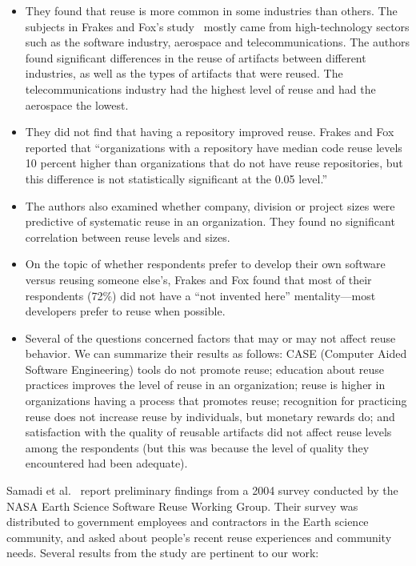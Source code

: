 \documentclass{casicswhitepaper}
\begin{document}
\begin{itemize}

\item They found that reuse is more common in some industries than others.  The subjects in Frakes and Fox's study~\cite{frakes1995sixteen} mostly came from high-technology sectors such as the software industry, aerospace and telecommunications.  The authors found significant differences in the reuse of artifacts between different industries, as well as the types of artifacts that were reused.  The telecommunications industry had the highest level of reuse and had the aerospace the lowest.

\item They did not find that having a repository improved reuse.  Frakes and Fox reported that ``organizations with a repository have median code reuse levels 10 percent higher than organizations that do not have reuse repositories, but this difference is not statistically significant at the 0.05 level.''

\item The authors also examined whether company, division or project sizes were predictive of systematic reuse in an organization.  They found no significant correlation between reuse levels and sizes.

\item On the topic of whether respondents prefer to develop their own software versus reusing someone else's, Frakes and Fox found that most of their respondents (72\%) did not have a ``not invented here'' mentality---most developers prefer to reuse when possible.

\item Several of the questions concerned factors that may or may not affect reuse behavior.  We can summarize their results as follows: CASE (Computer Aided Software Engineering) tools do not promote reuse; education about reuse practices improves the level of reuse in an organization; reuse is higher in organizations having a process that promotes reuse;  recognition for practicing reuse does not increase reuse by individuals, but monetary rewards do; and satisfaction with the quality of reusable artifacts did not affect reuse levels among the respondents (but this was because the level of quality they encountered had been adequate).

\end{itemize}

Samadi et al.~\cite{samadi_2004} report preliminary findings from a 2004 survey conducted by the NASA Earth Science Software Reuse Working Group. Their survey was distributed to government employees and contractors in the Earth science community, and asked about people's recent reuse experiences and community needs.  Several results from the study are pertinent to our work:
\end{document}

